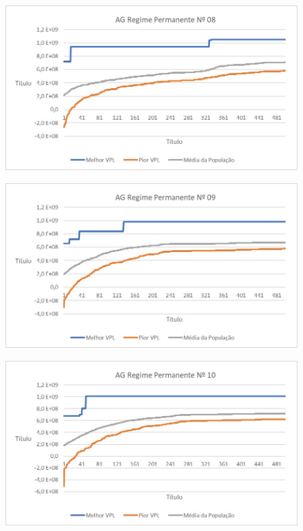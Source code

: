 \documentclass[12pt,a4paper]{report}
\begin{document}
\begin{figure}[H]
\centering

\includegraphics[scale=1]{AGRP/8}

\end{figure}
\begin{figure}[H]
\centering

\includegraphics[scale=1]{AGRP/9}

\end{figure}
\begin{figure}[H]
\centering

\includegraphics[scale=1]{AGRP/10}

\end{figure}
\end{document}
